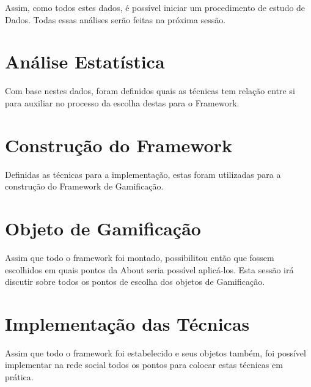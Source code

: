 Assim, como todos estes dados, é possível iniciar um procedimento de estudo de Dados.
Todas essas análises serão feitas na próxima sessão.

\section{Análise Estatística}
\label{sec:gamifição}
Com base nestes dados, foram definidos quais as técnicas tem relação entre si para auxiliar no processo
da escolha destas para o Framework.

\section{Construção do Framework}
\label{sec:gamifição}
Definidas as técnicas para a implementação, estas foram utilizadas para a construção do Framework
de Gamificação.

\section{Objeto de Gamificação}
\label{sec:gamifição}
Assim que todo o framework foi montado, possibilitou então que fossem escolhidos em quais
pontos da About seria possível aplicá-los. Esta sessão irá discutir sobre todos os pontos de escolha
dos objetos de Gamificação.

\section{Implementação das Técnicas}
\label{sec:gamifição}
Assim que todo o framework foi estabelecido e seus objetos também, foi possível implementar
na rede social todos os pontos para colocar estas técnicas em prática.
